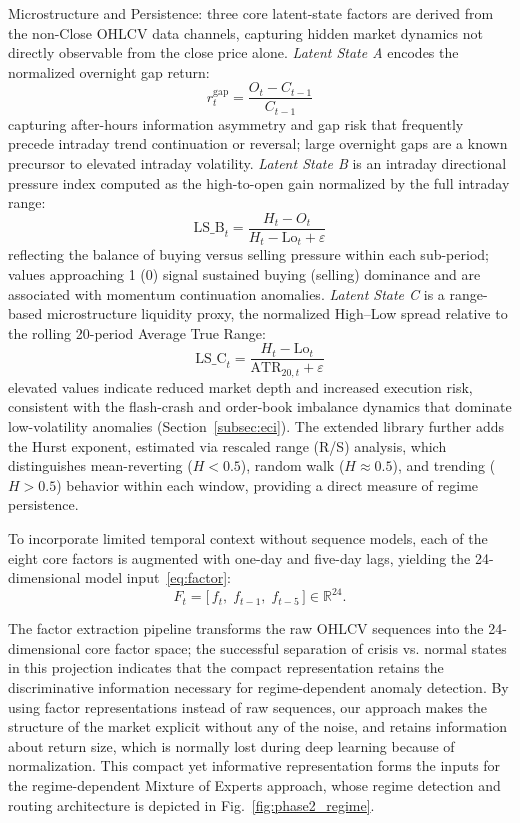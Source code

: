 \documentclass[]{interact}
\begin{document}
Microstructure and Persistence: three core latent-state factors are derived from the non-Close OHLCV data channels, capturing hidden market dynamics not directly observable from the close price alone. \emph{Latent State A} encodes the normalized overnight gap return:
\begin{equation}
    r^{\text{gap}}_t = \frac{O_t - C_{t-1}}{C_{t-1}}
\end{equation}
capturing after-hours information asymmetry and gap risk that frequently precede intraday trend continuation or reversal; large overnight gaps are a known precursor to elevated intraday volatility. \emph{Latent State B} is an intraday directional pressure index computed as the high-to-open gain normalized by the full intraday range:
\begin{equation}
    \text{LS\_B}_t = \frac{H_t - O_t}{H_t - \mathrm{Lo}_t + \varepsilon}
\end{equation}
reflecting the balance of buying versus selling pressure within each sub-period; values approaching 1 (0) signal sustained buying (selling) dominance and are associated with momentum continuation anomalies. \emph{Latent State C} is a range-based microstructure liquidity proxy, the normalized High--Low spread relative to the rolling 20-period Average True Range:
\begin{equation}
    \text{LS\_C}_t = \frac{H_t - \mathrm{Lo}_t}{\mathrm{ATR}_{20,t} + \varepsilon}
\end{equation}
elevated values indicate reduced market depth and increased execution risk, consistent with the flash-crash and order-book imbalance dynamics that dominate low-volatility anomalies (Section~\ref{subsec:eci}). The extended library further adds the Hurst exponent, estimated via rescaled range (R/S) analysis, which distinguishes mean-reverting ($H < 0.5$), random walk ($H \approx 0.5$), and trending ($H > 0.5$) behavior within each window, providing a direct measure of regime persistence.

To incorporate limited temporal context without sequence models, each of the eight core factors is augmented with one-day and five-day lags, yielding the 24-dimensional model input~\eqref{eq:factor}:
\begin{equation}
    F_t = \bigl[\, f_t,\; f_{t-1},\; f_{t-5} \,\bigr]
    \in \mathbb{R}^{24}.
    \label{eq:factor}
\end{equation}

The factor extraction pipeline transforms the raw OHLCV sequences into the 24-dimensional core factor space; the successful separation of crisis vs. normal states in this projection indicates that the compact representation retains the discriminative information necessary for regime-dependent anomaly detection. By using factor representations instead of raw sequences, our approach makes the structure of the market explicit without any of the noise, and retains information about return size, which is normally lost during deep learning because of normalization. This compact yet informative representation forms the inputs for the regime-dependent Mixture of Experts approach, whose regime detection and routing architecture is depicted in Fig.~\ref{fig:phase2_regime}.
\end{document}
